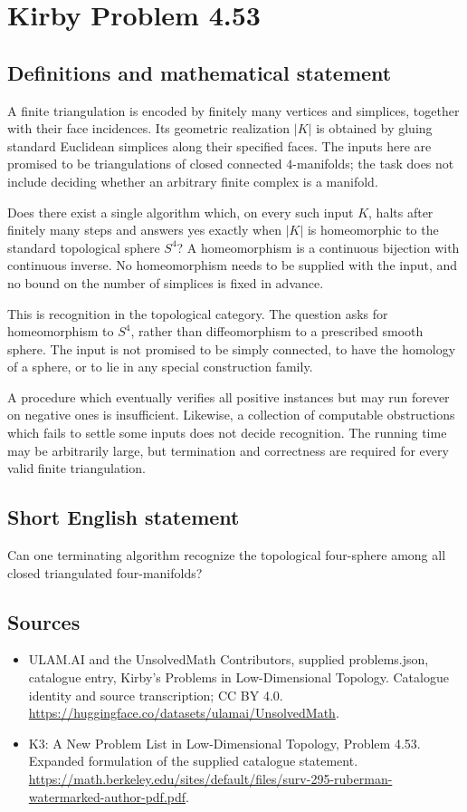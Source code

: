 \documentclass[11pt,a4paper]{article}
\begin{document}
\section*{Kirby Problem 4.53}\label{statement}

\subsection{Definitions and mathematical statement}
A finite triangulation is encoded by finitely many vertices and
simplices, together with their face incidences. Its geometric realization
$|K|$ is obtained by gluing standard Euclidean simplices along their
specified faces. The inputs here are promised to be triangulations of
closed connected $4$-manifolds; the task does not include deciding
whether an arbitrary finite complex is a manifold.

Does there exist a single algorithm which, on every such input $K$,
halts after finitely many steps and answers yes exactly when $|K|$
is homeomorphic to the standard topological sphere $S^4$? A
homeomorphism is a continuous bijection with continuous inverse.
No homeomorphism needs to be supplied with the input, and no bound
on the number of simplices is fixed in advance.

This is recognition in the topological category. The question asks
for homeomorphism to $S^4$, rather than diffeomorphism to a prescribed
smooth sphere. The input is not promised to be simply connected, to
have the homology of a sphere, or to lie in any special construction
family.

A procedure which eventually verifies all positive instances but may
run forever on negative ones is insufficient. Likewise, a collection
of computable obstructions which fails to settle some inputs does
not decide recognition. The running time may be arbitrarily large,
but termination and correctness are required for every valid finite
triangulation.
\subsection{Short English statement}
Can one terminating algorithm recognize the topological four-sphere among all closed triangulated four-manifolds?
\subsection{Sources}
\begin{itemize}
\item[S1] ULAM.AI and the UnsolvedMath Contributors, supplied problems.json, catalogue entry, Kirby's Problems in Low-Dimensional Topology. Catalogue identity and source transcription; CC BY 4.0.
\url{https://huggingface.co/datasets/ulamai/UnsolvedMath}.
\item[S2] K3: A New Problem List in Low-Dimensional Topology, Problem 4.53. Expanded formulation of the supplied catalogue statement.
\url{https://math.berkeley.edu/sites/default/files/surv-295-ruberman-watermarked-author-pdf.pdf}.
\end{itemize}
\end{document}
